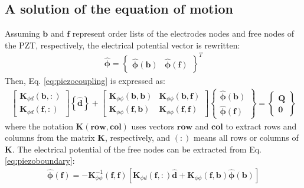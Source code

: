 \documentclass[a4paper,12pt]{article}
\begin{document}
{\subsection{A solution of the equation of motion}
\label{sec:time_integration}
Assuming \(\textbf{b}\) and \(\textbf{f}\) represent order lists of the electrodes nodes and free nodes of the PZT, respectively, the electrical potential vector is rewritten:
\begin{eqnarray}
\widehat{\boldsymbol{\phi}} = \left \{\begin{array}{cc}
\widehat{\boldsymbol{\phi}}(\textbf{b}) &
\widehat{\boldsymbol{\phi}}(\textbf{f})
\end{array}\right \}^T
\label{eq:potential}
\end{eqnarray}
Then, Eq. \ref{eq:piezocoupling} is expressed as:
\begin{eqnarray}
\left [\begin{array}{c}
\textbf{K}_{\phi d}(\textbf{b},:) \\
\textbf{K}_{\phi d}(\textbf{f},:)
\end{array}\right]
\left \{\widehat{\textbf{d}}\right\} +
\left [\begin{array}{cc}
\textbf{K}_{\phi \phi}(\textbf{b},\textbf{b}) & \textbf{K}_{\phi \phi}(\textbf{b},\textbf{f})\\
\textbf{K}_{\phi \phi}(\textbf{f},\textbf{b}) & \textbf{K}_{\phi \phi}(\textbf{f},\textbf{f})
\end{array}\right]
\left \{\begin{array}{c}
\widehat{\boldsymbol{\phi}}(\textbf{b}) \\
\widehat{\boldsymbol{\phi}}(\textbf{f})
\end{array}\right \} = 
\left \{\begin{array}{c}
\textbf{Q} \\
\textbf{0}
\end{array}\right \}
\label{eq:piezoboundary}
\end{eqnarray} 
where the notation \(\textbf{K}(\textbf{row},\textbf{col})\) uses vectors \(\textbf{row}\) and \(\textbf{col}\) to extract rows and columns from the matrix \(\textbf{K}\), respectively, and \((:)\) means all rows or columns of \(\textbf{K}\).
The electrical potential of the free nodes can be extracted from Eq. \ref{eq:piezoboundary}:
\begin{eqnarray}
\widehat{\boldsymbol{\phi}}(\textbf{f}) = -\textbf{K}_{\phi\phi}^{-1}(\textbf{f},\textbf{f})\left[\textbf{K}_{\phi d}(\textbf{f},:) \widehat{\textbf{d}} + \textbf{K}_{\phi\phi}(\textbf{f},\textbf{b})\widehat{\boldsymbol{\phi}}(\textbf{b}) \right]

\end{eqnarray}}
\end{document}
